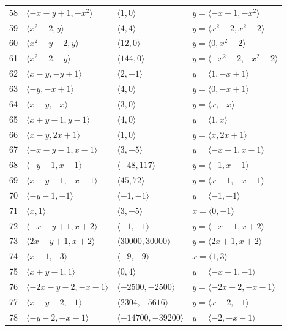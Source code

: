 \documentclass[11pt]{article}
\begin{document}
\begin{longtable}{@{}rlll@{}}
58 & $\langle -x-y+1,-x^{2}\rangle$ & $\langle 1,0\rangle$ & $y=\langle -x+1,-x^{2}\rangle$\\
59 & $\langle x^{2}-2,y\rangle$ & $\langle 4,4\rangle$ & $y=\langle x^{2}-2,x^{2}-2\rangle$\\
60 & $\langle x^{2}+y+2,y\rangle$ & $\langle 12,0\rangle$ & $y=\langle 0,x^{2}+2\rangle$\\
61 & $\langle x^{2}+2,-y\rangle$ & $\langle 144,0\rangle$ & $y=\langle -x^{2}-2,-x^{2}-2\rangle$\\
62 & $\langle x-y,-y+1\rangle$ & $\langle 2,-1\rangle$ & $y=\langle 1,-x+1\rangle$\\
63 & $\langle -y,-x+1\rangle$ & $\langle 4,0\rangle$ & $y=\langle 0,-x+1\rangle$\\
64 & $\langle x-y,-x\rangle$ & $\langle 3,0\rangle$ & $y=\langle x,-x\rangle$\\
65 & $\langle x+y-1,y-1\rangle$ & $\langle 4,0\rangle$ & $y=\langle 1,x\rangle$\\
66 & $\langle x-y,2x+1\rangle$ & $\langle 1,0\rangle$ & $y=\langle x,2x+1\rangle$\\
67 & $\langle -x-y-1,x-1\rangle$ & $\langle 3,-5\rangle$ & $y=\langle -x-1,x-1\rangle$\\
68 & $\langle -y-1,x-1\rangle$ & $\langle -48,117\rangle$ & $y=\langle -1,x-1\rangle$\\
69 & $\langle x-y-1,-x-1\rangle$ & $\langle 45,72\rangle$ & $y=\langle x-1,-x-1\rangle$\\
70 & $\langle -y-1,-1\rangle$ & $\langle -1,-1\rangle$ & $y=\langle -1,-1\rangle$\\
71 & $\langle x,1\rangle$ & $\langle 3,-5\rangle$ & $x=\langle 0,-1\rangle$\\
72 & $\langle -x-y+1,x+2\rangle$ & $\langle -1,-1\rangle$ & $y=\langle -x+1,x+2\rangle$\\
73 & $\langle 2x-y+1,x+2\rangle$ & $\langle 30000,30000\rangle$ & $y=\langle 2x+1,x+2\rangle$\\
74 & $\langle x-1,-3\rangle$ & $\langle -9,-9\rangle$ & $x=\langle 1,3\rangle$\\
75 & $\langle x+y-1,1\rangle$ & $\langle 0,4\rangle$ & $y=\langle -x+1,-1\rangle$\\
76 & $\langle -2x-y-2,-x-1\rangle$ & $\langle -2500,-2500\rangle$ & $y=\langle -2x-2,-x-1\rangle$\\
77 & $\langle x-y-2,-1\rangle$ & $\langle 2304,-5616\rangle$ & $y=\langle x-2,-1\rangle$\\
78 & $\langle -y-2,-x-1\rangle$ & $\langle -14700,-39200\rangle$ & $y=\langle -2,-x-1\rangle$\\

\end{longtable}
\end{document}
